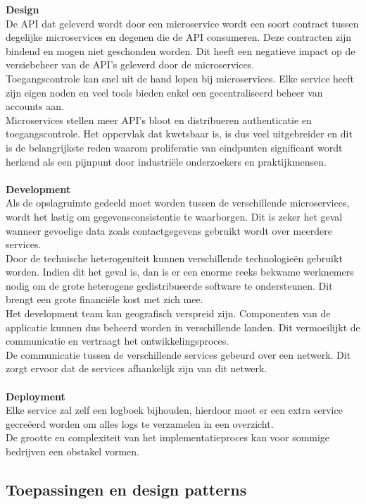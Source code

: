 \textbf{Design} \\De API dat geleverd wordt door een microservice wordt een soort contract tussen degelijke microservices en degenen die de API consumeren. Deze contracten zijn bindend en mogen niet geschonden worden. Dit heeft een negatieve impact op de versiebeheer van de API's geleverd door de microservices.\\    Toegangscontrole kan snel uit de hand lopen bij microservices. Elke service heeft zijn eigen noden en veel tools bieden enkel een gecentraliseerd beheer van accounts aan.\\    Microservices stellen meer API's bloot en distribueren authenticatie en toegangscontrole. Het oppervlak dat kwetsbaar is, is dus veel uitgebreider en dit is de belangrijkste reden waarom proliferatie van eindpunten significant wordt herkend als een pijnpunt door industriële onderzoekers en praktijkmensen.\\  \\
\textbf{Development} \\ Als de opslagruimte gedeeld moet worden tussen de verschillende microservices, wordt het lastig om gegevensconsistentie te waarborgen. Dit is zeker het geval wanneer gevoelige data zoals contactgegevens gebruikt wordt over meerdere services.\\
Door de technische heterogeniteit kunnen verschillende technologieën gebruikt worden. Indien dit het geval is, dan is er een enorme reeks bekwame werknemers nodig om de grote heterogene gedistribueerde software te ondersteunen. Dit brengt een grote financiële kost met zich mee.\\
Het development team kan geografisch verspreid zijn. Componenten van de applicatie kunnen dus beheerd worden in verschillende landen. Dit vermoeilijkt de communicatie en vertraagt het ontwikkelingsproces.\\
De communicatie tussen de verschillende services gebeurd over een netwerk. Dit zorgt ervoor dat de services afhankelijk zijn van dit netwerk.\\ \\
\textbf{Deployment} \\ Elke service zal zelf een logboek bijhouden, hierdoor moet er een extra service gecreëerd worden om alles logs te verzamelen in een overzicht.\\
De grootte en complexiteit van het implementatieproces kan voor sommige bedrijven een obstakel vormen.

\subsection{Toepassingen en design patterns}


